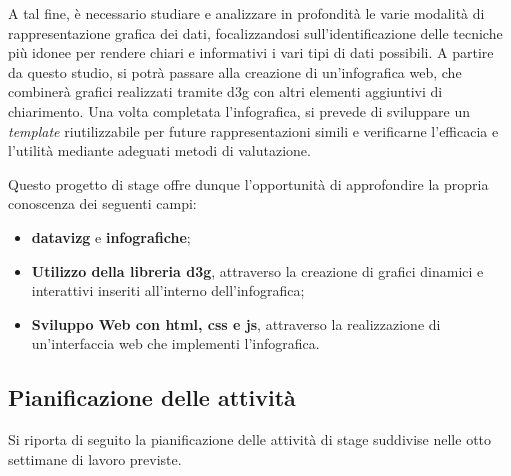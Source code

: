 A tal fine, è necessario studiare e analizzare in profondità le varie modalità di rappresentazione
grafica dei dati, focalizzandosi sull'identificazione delle tecniche più idonee per rendere chiari e
informativi i vari tipi di dati possibili. A partire da questo studio, si potrà passare alla creazione di un'infografica
web, che combinerà grafici realizzati tramite \gls{d3g} con altri elementi aggiuntivi di chiarimento. Una
volta completata l'infografica, si prevede di sviluppare un \emph{template} riutilizzabile per future rappresentazioni
simili e verificarne l'efficacia e l'utilità mediante adeguati metodi di valutazione. 

Questo progetto di stage offre dunque l'opportunità di approfondire la propria conoscenza dei seguenti campi:
\begin{itemize}
    \item \textbf{\gls{datavizg}} e \textbf{infografiche};
    \item \textbf{Utilizzo della libreria \gls{d3g}}, attraverso la creazione di grafici dinamici e interattivi inseriti all'interno dell'infografica;
    \item \textbf{Sviluppo Web con \gls{html}, \gls{css} e \gls{js}}, attraverso la realizzazione di un'interfaccia web che implementi l'infografica.
\end{itemize}


\subsection{Pianificazione delle attività}
Si riporta di seguito la pianificazione delle attività di stage suddivise 
nelle otto settimane di lavoro previste.

